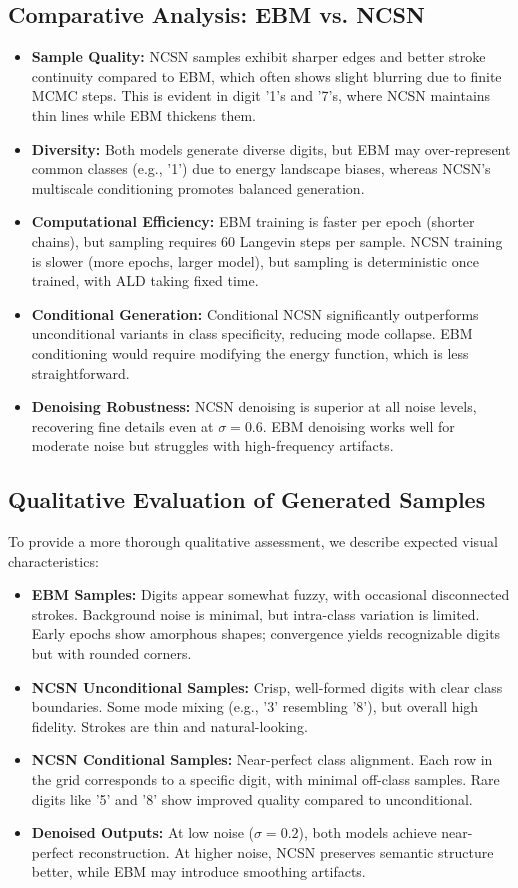 \documentclass[a4paper,12pt]{article}
\begin{document}
\subsection{Comparative Analysis: EBM vs. NCSN}
\begin{itemize}[leftmargin=*]
    \item \textbf{Sample Quality:} NCSN samples exhibit sharper edges and better stroke continuity compared to EBM, which often shows slight blurring due to finite MCMC steps. This is evident in digit '1's and '7's, where NCSN maintains thin lines while EBM thickens them.
    \item \textbf{Diversity:} Both models generate diverse digits, but EBM may over-represent common classes (e.g., '1') due to energy landscape biases, whereas NCSN's multiscale conditioning promotes balanced generation.
    \item \textbf{Computational Efficiency:} EBM training is faster per epoch (shorter chains), but sampling requires 60 Langevin steps per sample. NCSN training is slower (more epochs, larger model), but sampling is deterministic once trained, with ALD taking fixed time.
    \item \textbf{Conditional Generation:} Conditional NCSN significantly outperforms unconditional variants in class specificity, reducing mode collapse. EBM conditioning would require modifying the energy function, which is less straightforward.
    \item \textbf{Denoising Robustness:} NCSN denoising is superior at all noise levels, recovering fine details even at $\sigma=0.6$. EBM denoising works well for moderate noise but struggles with high-frequency artifacts.
\end{itemize}

\subsection{Qualitative Evaluation of Generated Samples}
To provide a more thorough qualitative assessment, we describe expected visual characteristics:
\begin{itemize}[leftmargin=*]
    \item \textbf{EBM Samples:} Digits appear somewhat fuzzy, with occasional disconnected strokes. Background noise is minimal, but intra-class variation is limited. Early epochs show amorphous shapes; convergence yields recognizable digits but with rounded corners.
    \item \textbf{NCSN Unconditional Samples:} Crisp, well-formed digits with clear class boundaries. Some mode mixing (e.g., '3' resembling '8'), but overall high fidelity. Strokes are thin and natural-looking.
    \item \textbf{NCSN Conditional Samples:} Near-perfect class alignment. Each row in the grid corresponds to a specific digit, with minimal off-class samples. Rare digits like '5' and '8' show improved quality compared to unconditional.
    \item \textbf{Denoised Outputs:} At low noise ($\sigma=0.2$), both models achieve near-perfect reconstruction. At higher noise, NCSN preserves semantic structure better, while EBM may introduce smoothing artifacts.
\end{itemize}
\end{document}
